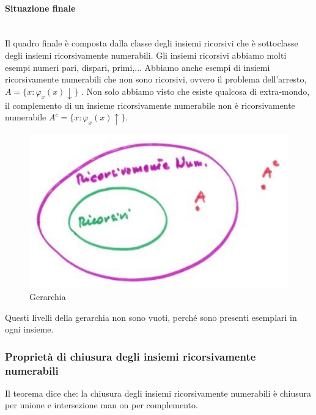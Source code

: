 \documentclass{article}
\begin{document}
\paragraph{Situazione finale}\mbox{}\\
Il quadro finale è composta dalla classe degli insiemi ricorsivi che è sottoclasse degli
insiemi ricorsivamente numerabili. Gli insiemi ricorsivi abbiamo molti esempi numeri pari,
dispari, primi,...
Abbiamo anche esempi di insiemi ricorsivamente numerabili che non sono ricorsivi, ovvero
il problema dell'arresto, $A=\{x:\varphi_x(x)\downarrow\}$ . Non solo abbiamo visto che
esiste qualcosa di extra-mondo, il complemento di un insieme ricorsivamente numerabile
non è ricorsivamente numerabile $A^c=\{x:\varphi_x(x)\uparrow\}$.
\begin{figure}[H]
    \centering
    \caption{Gerarchia}
    \includegraphics[scale=0.5]{images/gerarchia.png}
\end{figure}
Questi livelli della gerarchia non sono vuoti, perché sono presenti esemplari in ogni insieme.

\subsubsection{Proprietà di chiusura degli insiemi ricorsivamente numerabili}
Il teorema dice che: la chiusura degli insiemi ricorsivamente numerabili è chiusura
per unione e intersezione man on per complemento.
\end{document}
